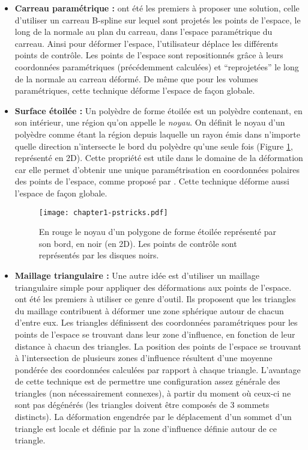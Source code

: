 \begin{itemize}

\item{\textbf{Carreau paramétrique :}} \cite{JLQ96} ont été les premiers à
proposer une solution, celle d'utiliser un carreau B-spline sur lequel sont
projetés les points de l'espace, le long de la normale au plan du carreau,
dans l'espace paramétrique du carreau. Ainsi pour déformer l'espace,
l'utilisateur déplace les différents points de contrôle. Les points de
l'espace sont repositionnés grâce à leurs coordonnées paramétriques
(précédemment calculées) et ``reprojetées'' le long de la normale au carreau
déformé. De même que pour les volumes paramétriques, cette technique déforme
l'espace de façon globale.

\item{\textbf{Surface étoilée :}} Un polyèdre de forme étoilée est un polyèdre
contenant, en son intérieur, une région qu'on appelle le \textit{noyau}. On
définit le noyau d'un polyèdre comme étant la région depuis laquelle un rayon
émis dans n'importe quelle direction n'intersecte le bord du polyèdre qu'une
seule fois (Figure \ref{SUReto}, représenté en 2D). Cette propriété est utile
dans le domaine de la déformation car elle permet d'obtenir une unique
paramétrisation en coordonnées polaires des points de l'espace, comme proposé
par \cite{JL00}. Cette technique déforme aussi l'espace de façon globale.

 \begin{figure}[ht]
 \begin{center}
  \texttt{[image: chapter1-pstricks.pdf]}

  \caption[Noyau d'un polygone] {En rouge le noyau d'un polygone de forme
étoilée représenté par son bord, en noir (en 2D). Les points de contrôle sont
représentés par les disques noirs.}

  \label{SUReto}
 \end{center}
 \end{figure}

\item{\textbf{Maillage triangulaire :}} Une autre idée est d'utiliser un
maillage triangulaire simple pour appliquer des déformations aux points de
l'espace. \cite{KO03} ont été les premiers à utiliser ce genre d'outil. Ils
proposent que les triangles du maillage contribuent à déformer une zone
sphérique autour de chacun d'entre eux. Les triangles définissent des
coordonnées paramétriques pour les points de l'espace se trouvant dans leur
zone d'influence, en fonction de leur distance à chacun des triangles. La
position des points de l'espace se trouvant à l'intersection de plusieurs
zones d'influence résultent d'une moyenne pondérée des coordonnées calculées
par rapport à chaque triangle. L'avantage de cette technique est de permettre
une configuration assez générale des triangles (non nécessairement connexes),
à partir du moment où ceux-ci ne sont pas dégénérés (les triangles doivent
être composés de 3 sommets distincts). La déformation engendrée par le
déplacement d'un sommet d'un triangle est locale et définie par la zone
d'influence définie autour de ce triangle.


\end{itemize}
